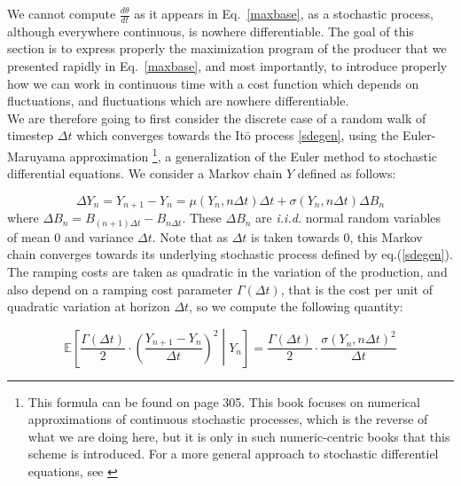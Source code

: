 We cannot compute $\frac{d\theta}{dt}$ as it appears in Eq.~\ref{maxbase}, as a stochastic process, although everywhere continuous, is nowhere differentiable. The goal of this section is to express properly the maximization program of the producer that we presented rapidly in Eq.~\ref{maxbase}, and most importantly, to introduce properly how we can work in continuous time with a cost function which depends on fluctuations, and fluctuations which are nowhere differentiable.\\

We are therefore going to first consider the discrete case of a random walk of timestep $\Delta t$ which converges towards the It\={o} process \ref{sdegen}, using the Euler-Maruyama approximation \cite{kloeden2011numerical}\footnote{This formula can be found on page 305. This book focuses on numerical approximations of continuous stochastic processes, which is the reverse of what we are doing here, but it is only in such numeric-centric books that this scheme is introduced. For a more general approach to stochastic differentiel equations, see \cite{oksendal2003stochastic}}, a generalization of the Euler method to stochastic differential equations. We consider a Markov chain $Y$ defined as follows: 

\begin{equation}
\Delta Y_n=Y_{n+1}-Y_n= \mu(Y_n,n \Delta t)\Delta t+\sigma (Y_n,n \Delta t)\Delta B_n
\end{equation}
where $\Delta B_n=B_{(n+1)\Delta t}-B_{n\Delta t}$. These $\Delta B_n$ are \emph{i.i.d.} normal random variables of mean $0$ and variance $\Delta t$. Note that as $\Delta t$ is taken towards $0$, this Markov chain converges towards its underlying stochastic process defined by eq.(\ref{sdegen}).\\

The ramping costs are taken as quadratic in the variation of the production, and also depend on a ramping cost parameter $\Gamma(\Delta t)$, that is the cost per unit of quadratic variation at horizon $\Delta t$, so we compute the following quantity: 

\begin{equation}
\mathbb{E}\left[\frac{\Gamma(\Delta t)}{2}\cdot\left(\frac{Y_{n+1}-Y_n}{\Delta t}\right)^2\middle \vert Y_n  \right]=\frac{\Gamma(\Delta t)}{2}\cdot\frac{\sigma (Y_n,n \Delta t)^2}{\Delta t}
\label{markovariation}
\end{equation}


